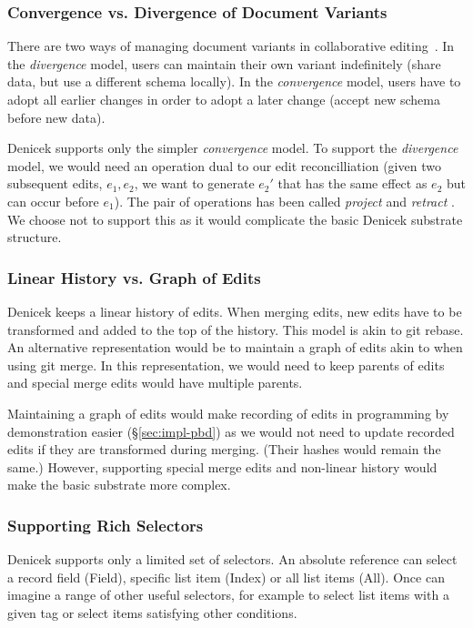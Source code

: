 \documentclass[sigconf,anonymous,screen]{acmart}
\newcommand{\ident}[1]{{\sffamily #1}}
\begin{document}
\subsubsection*{Convergence vs. Divergence of Document Variants}
There are two ways of managing document variants in collaborative editing~\cite{edwards-2025-schema}.
In the \emph{divergence} model, users can maintain their own variant indefinitely (share data,
but use a different schema locally). In the \emph{convergence} model, users have to adopt all
earlier changes in order to adopt a later change (accept new schema before new data).

Denicek supports only the simpler \emph{convergence} model. To support the \emph{divergence}
model, we would need an operation dual to our edit reconcilliation (given two subsequent edits,
$e_1, e_2$, we want to generate $e_2'$ that has the same effect as $e_2$ but can occur before
$e_1$). The pair of operations has been called \emph{project} and \emph{retract}
\cite{edwards-2021-typed}. We choose not to support this as it would complicate the basic
Denicek substrate structure.

\subsubsection*{Linear History vs. Graph of Edits}
Denicek keeps a linear history of edits. When merging edits, new edits have to be transformed and
added to the top of the history. This model is akin to git rebase. An alternative representation
would be to maintain a graph of edits akin to when using git merge. In this representation,
we would need to keep parents of edits and special merge edits would have multiple parents.

Maintaining a graph of edits would make recording of edits in programming by demonstration
easier (\S\ref{sec:impl-pbd}) as we would not need to update recorded edits if they are
transformed during merging. (Their hashes would remain the same.) However, supporting special
merge edits and non-linear history would make the basic substrate more complex.

\subsubsection*{Supporting Rich Selectors}
Denicek supports only a limited set of selectors. An absolute reference can select a record
field (\ident{Field}), specific list item (\ident{Index}) or all list items (\ident{All}).
Once can imagine a range of other useful selectors, for example to select list items with a
given tag or select items satisfying other conditions.
\end{document}
